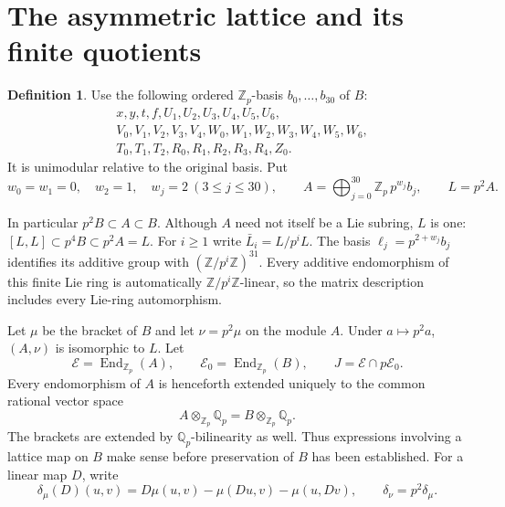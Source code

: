 \documentclass[11pt]{article}
\theoremstyle{definition}\newtheorem{definition}[theorem]{Definition}
\theoremstyle{remark}\newtheorem{remark}[theorem]{Remark}
\DeclareMathOperator{\End}{End}
\newcommand{\Zp}{\mathbb Z_p}
\newcommand{\Qp}{\mathbb Q_p}
\newcommand{\EE}{\mathcal E}
\begin{document}
\section{The asymmetric lattice and its finite quotients}
\begin{definition}\label{def:A}
Use the following ordered $\Zp$-basis $b_0,\ldots,b_{30}$ of $B$:
\begin{align*}
&x,y,t,f,U_1,U_2,U_3,U_4,U_5,U_6,\\
&V_0,V_1,V_2,V_3,V_4,W_0,W_1,W_2,W_3,W_4,W_5,W_6,\\
&T_0,T_1,T_2,R_0,R_1,R_2,R_3,R_4,Z_0.
\end{align*}
It is unimodular relative to the original basis. Put
\[
 w_0=w_1=0,\quad w_2=1,\quad w_j=2\ (3\le j\le30),
 \qquad A=\bigoplus_{j=0}^{30}\Zp\,p^{w_j}b_j,
 \qquad L=p^2 A.
\]
\end{definition}
In particular $p^2B\subset A\subset B$. Although $A$ need not itself be a
Lie subring, $L$ is one: $[L,L]\subset p^4B\subset p^2A=L$.
For $i\ge1$ write $\bar L_i=L/p^iL$.
The basis $\ell_j=p^{2+w_j}b_j$ identifies its additive group with
$(\mathbb Z/p^i\mathbb Z)^{31}$. Every additive endomorphism of this
finite Lie ring is automatically $\mathbb Z/p^i\mathbb Z$-linear,
so the matrix description includes every Lie-ring automorphism.

Let $\mu$ be the bracket of $B$ and let $\nu=p^2\mu$ on the module $A$.
Under $a\mapsto p^2a$, $(A,\nu)$ is isomorphic to $L$.
Let
\[
 \EE=\End_{\Zp}(A),\qquad \EE_0=\End_{\Zp}(B),\qquad
 J=\EE\cap p\EE_0.
\]
Every endomorphism of $A$ is henceforth extended uniquely to the common
rational vector space
\[
 A\otimes_{\Zp}\Qp=B\otimes_{\Zp}\Qp.
\]
The brackets are extended by $\Qp$-bilinearity as well. Thus expressions
involving a lattice map on $B$ make sense before preservation of $B$ has
been established. For a linear map $D$, write
\[
 \delta_\mu(D)(u,v)=D\mu(u,v)-\mu(Du,v)-\mu(u,Dv),
 \qquad\delta_\nu=p^2\delta_\mu.
\]
\end{document}
